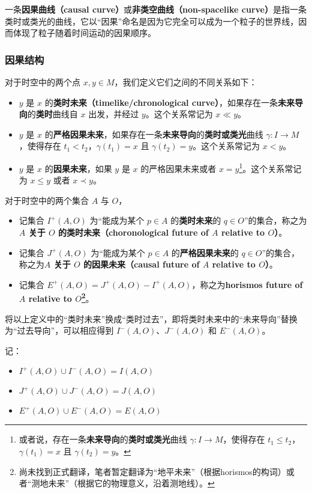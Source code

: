一条\textbf{因果曲线（causal curve）}或\textbf{非类空曲线（non-spacelike curve）}是指一条类时或类光的曲线，它以“因果”命名是因为它完全可以成为一个粒子的世界线，因而体现了粒子随着时间运动的因果顺序。


\subsubsection{因果结构}

对于时空中的两个点 $x, y\in M$，我们定义它们之间的不同关系如下：

\begin{itemize}
\item $y$ 是 $x$ 的\textbf{类时未来（timelike/chronological curve）}，如果存在一条\textbf{未来导向}的\textbf{类时}曲线自 $x$ 出发，并经过 $y$。这个关系常记为 $x\ll y$。
\item $y$ 是 $x$ 的\textbf{严格因果未来}，如果存在一条\textbf{未来导向}的\textbf{类时或类光}曲线 $\gamma:I\rightarrow M$，使得存在 $t_1<t_2$，$\gamma(t_1)=x$ 且 $\gamma(t_2)=y$。这个关系常记为 $x< y$。
\item $y$ 是 $x$ 的\textbf{因果未来}，如果 $y$ 是 $x$ 的严格因果未来或者 $x=y$\footnote{或者说，存在一条\textbf{未来导向}的\textbf{类时或类光}曲线 $\gamma:I\rightarrow M$，使得存在 $t_1\leq t_2$，$\gamma(t_1)=x$ 且 $\gamma(t_2)=y$。}。这个关系常记为 $x\leq y$ 或者 $x\prec y$。
\end{itemize}

对于时空中的两个集合 $A$ 与 $O$，


\begin{itemize}
\item 记集合 $I^+(A, O)$ 为“能成为某个 $p\in A$ 的\textbf{类时未来}的 $q\in O$”的集合，称之为\textbf{$A$ 关于 $O$ 的类时未来（choronological future of $A$ relative to $O$）}。
\item 记集合 $J^+(A, O)$ 为“能成为某个 $p\in A$ 的\textbf{严格因果未来}的 $q\in O$”的集合，称之为\textbf{$A$ 关于 $O$ 的因果未来（causal future of $A$ relative to $O$）}。
\item 记集合 $E^+(A, O)=J^+(A, O)-I^+(A, O)$，称之为\textbf{horismos future of $A$ relative to $O$\footnote{尚未找到正式翻译，笔者暂定翻译为“地平未来”（根据horismos的构词）或者“测地未来”（根据它的物理意义，沿着测地线）。}}。
\end{itemize}

将以上定义中的“类时未来”换成“类时过去”，即将类时未来中的“未来导向”替换为“过去导向”，可以相应得到 $I^-(A, O)$、$J^-(A, O)$ 和 $E^-(A, O)$。

记：
\begin{itemize}
\item $I^+(A, O)\cup I^-(A, O)=I(A,O)$
\item $J^+(A, O)\cup J^-(A, O)=J(A,O)$
\item $E^+(A, O)\cup E^-(A, O)=E(A,O)$
\end{itemize}

